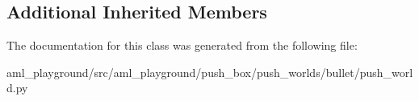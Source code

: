 \subsection*{Additional Inherited Members}


The documentation for this class was generated from the following file\-:\begin{DoxyCompactItemize}
\item 
aml\-\_\-playground/src/aml\-\_\-playground/push\-\_\-box/push\-\_\-worlds/bullet/push\-\_\-world.\-py\end{DoxyCompactItemize}

